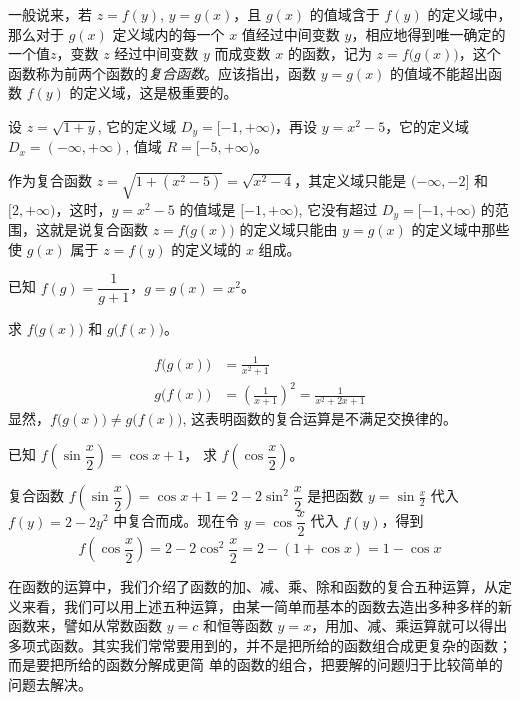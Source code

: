 一般说来，若 $z=f(y)$, $y=g(x)$，且 $g(x)$ 的值域含于 $f(y)$ 的定义域中，那么对于 $g(x)$ 定义域内的每一个 $x$ 值经过中间变数 $y$，相应地得到唯一确定的一个值$z$，变数 $z$ 经过中间变数 $y$ 而成变数 $x$ 的函数，记为 $z=f\big(g(x)\big)$，这个函数称为前两个函数的\emph{复合函数}。应该指出，函数 $y=g(x)$ 的值域不能超出函数 $f(y)$ 的定义域，这是极重要的。


\begin{example}
    设 $z=\sqrt{1+y}$, 它的定义域 $D_y=[-1,+\infty)$，再设 $y=x^2-5$，它的定义域 $D_x=(-\infty,+\infty)$, 值域 $R=[-5,+\infty)$。

作为复合函数 $z=\sqrt{1+(x^2-5)}=\sqrt{x^2-4}$，其定义域只能是 $(-\infty,-2]$ 和$[2,+\infty)$，这时，$y=x^2-5$ 的值域是 $[-1,+\infty)$, 它没有超过 $D_y=[-1,+\infty)$ 的范围，这就是说复合函数 $z=f\big(g(x)\big)$ 的定义域只能由 $y=
g(x)$ 的定义域中那些使 $g(x)$ 属于 $z=f(y)$ 的定义域的 $x$ 组成。
\end{example}

\begin{example}
已知 $f(g)=\dfrac{1}{g+1}$，$g=g(x)=x^2$。

求 $f\big(g(x)\big)$ 和 $g\big(f(x)\big)$。    
\end{example}

\begin{solution}
\[\begin{split}
    f\big(g(x)\big)&=\frac{1}{x^2+1}\\
    g\big(f(x)\big)&=\left(\frac{1}{x+1}\right)^2=\frac{1}{x^2+2x+1}
\end{split}\]
显然，$f\big(g(x)\big)\ne g\big(f(x)\big)$, 这表明函数的复合运算是不满足交换律的。
\end{solution}

\begin{example}
已知 $f\left(\sin\dfrac{x}{2}\right)=\cos x+1$，
求 $f\left(\cos\dfrac{x}{2}\right)$。
\end{example}    

\begin{solution}
复合函数 $f\left(\sin\dfrac{x}{2}\right)=\cos x+1=2-2\sin^2\dfrac{x}{2}$ 是把函数 $y=\sin\frac{x}{2}$ 代入 $f(y)=2-2y^2$ 中复合而成。现在令 $y=\cos\dfrac{x}{2}$ 代入 $f(y)$，得到
\[f\left(\cos\frac{x}{2}\right)=2-2\cos^2\frac{x}{2}=2-(1+\cos x)=1-\cos x\]
\end{solution}    

在函数的运算中，我们介绍了函数的加、减、乘、除和函数的复合五种运算，从定义来看，我们可以用上述五种运算，由某一简单而基本的函数去造出多种多样的新函数来，譬如从常数函数 $y=c$ 和恒等函数 $y=x$，用加、减、乘运算就可以得出多项式函数。其实我们常常要用到的，并不是把所给的函数组合成更复杂的函数；而是要把所给的函数分解成更简
单的函数的组合，把要解的问题归于比较简单的问题去解决。

